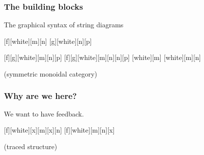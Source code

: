 \begin{frame}
    \frametitle{The building blocks}

    \centering

    \await
    \LARGE
    The graphical syntax of \alert{string diagrams}

    \await
    \normalsize
    \vspace{2em}

    [f][white][m][n]
    [g][white][n][p]

    \await
    \vspace{2em}

    [f][g][white][m][n][p]
    [f][g][white][m][n][n][p]
    \await
    [white][m]
    [white][m][n]

    \normalsize
    \vspace{1em}

    (\alert{symmetric monoidal category})

\end{frame}
\begin{frame}
    \frametitle{Why are we here?}

    \centering
    \LARGE
    We want to have \alert{feedback}.

    \await
    \normalsize
    \vspace{2em}

    [f][white][x][m][x][n]
    \quad
    \await
    \scalebox{2}{\(\Rightarrow\)}
    \quad
    [f][white][m][n][x]

    \await
    \vspace{1em}
    (traced structure)

\end{frame}
